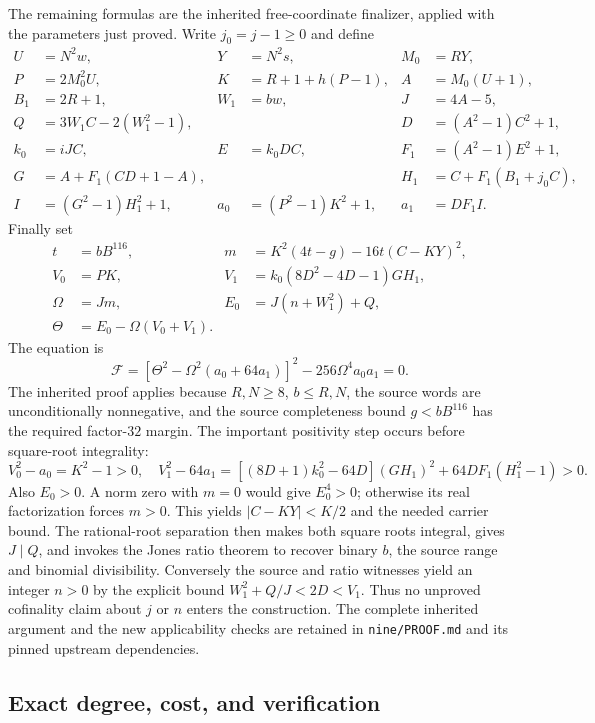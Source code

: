 The remaining formulas are the inherited free-coordinate finalizer,
applied with the parameters just proved.  Write $j_0=j-1\ge0$ and define
\[
\begin{aligned}
 U&=N^2w,&Y&=N^2s,&M_0&=RY,\\
 P&=2M_0^2U,&K&=R+1+h(P-1),&A&=M_0(U+1),\\
 B_1&=2R+1,&W_1&=bw,&J&=4A-5,\\
 Q&=3W_1C-2(W_1^2-1),&&&D&=(A^2-1)C^2+1,\\
 k_0&=iJC,&E&=k_0DC,&F_1&=(A^2-1)E^2+1,\\
 G&=A+F_1(CD+1-A),&&&H_1&=C+F_1(B_1+j_0C),\\
 I&=(G^2-1)H_1^2+1,&a_0&=(P^2-1)K^2+1,&a_1&=DF_1I.
\end{aligned}
\]
Finally set
\[
\begin{aligned}
 t&=bB^{116},&m&=K^2(4t-g)-16t(C-KY)^2,\\
 V_0&=PK,&V_1&=k_0(8D^2-4D-1)GH_1,\\
 \Omega&=Jm,&E_0&=J(n+W_1^2)+Q,\\
 \Theta&=E_0-\Omega(V_0+V_1).
\end{aligned}
\]
The equation is
\begin{equation}
 \boxed{\mathcal F=
 [\Theta^2-\Omega^2(a_0+64a_1)]^2
       -256\Omega^4a_0a_1=0.}
 \label{eq:compact-nine}
\end{equation}
The inherited proof applies because $R,N\ge8$, $b\le R,N$, the source
words are unconditionally nonnegative, and the source completeness bound
$g<bB^{116}$ has the required factor-$32$ margin.
The important positivity step occurs before square-root integrality:
\[
 V_0^2-a_0=K^2-1>0,
 \quad
 V_1^2-64a_1=
 [(8D+1)k_0^2-64D](GH_1)^2+64DF_1(H_1^2-1)>0.
\]
Also $E_0>0$.  A norm zero with $m=0$ would give $E_0^4>0$;
otherwise its real factorization forces $m>0$.  This yields
$|C-KY|<K/2$ and the needed carrier bound.  The rational-root separation
then makes both square roots integral, gives $J\mid Q$, and invokes the
Jones ratio theorem to recover binary $b$, the source range and binomial
divisibility.  Conversely the source and ratio witnesses yield an integer
$n>0$ by the explicit bound $W_1^2+Q/J<2D<V_1$.  Thus no unproved cofinality
claim about $j$ or $n$ enters the construction.  The complete inherited
argument and the new applicability checks are retained in
\texttt{nine/PROOF.md} and its pinned upstream dependencies.

\subsection{Exact degree, cost, and verification}

